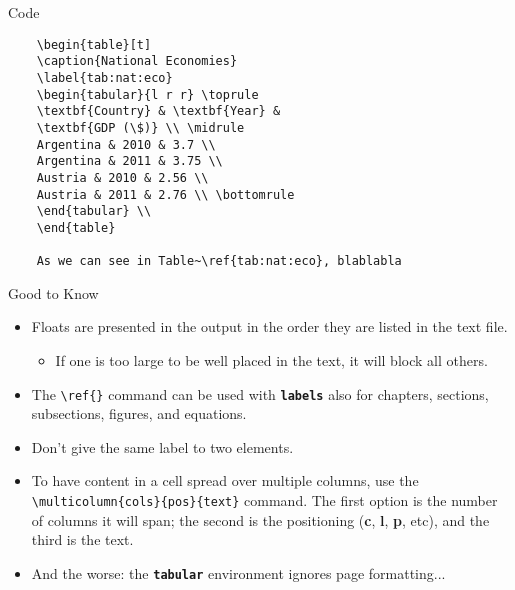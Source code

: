 \documentclass{beamer}
\newcommand{\bftt}[1]{\textbf{\texttt{#1}}}
\newcommand{\cmd}[1]{{\color[HTML]{008000}\bftt{#1}}}
\begin{document}
\begin{frame}[fragile]{Code}
	\begin{verbatim}
	\begin{table}[t]
	\caption{National Economies}
	\label{tab:nat:eco}
	\begin{tabular}{l r r} \toprule
	\textbf{Country} & \textbf{Year} &
	\textbf{GDP (\$)} \\ \midrule
	Argentina & 2010 & 3.7 \\
	Argentina & 2011 & 3.75 \\
	Austria & 2010 & 2.56 \\
	Austria & 2011 & 2.76 \\ \bottomrule
	\end{tabular} \\
	\end{table}
	
	As we can see in Table~\ref{tab:nat:eco}, blablabla
	\end{verbatim}
\end{frame}

\begin{frame}[fragile]{Good to Know}
	\begin{itemize}
		\item Floats are presented in the output in the order they are listed in the text file.
		\begin{itemize}
			\item If one is too large to be well placed in the text, it will block all others.
		\end{itemize}
		\item The \verb|\ref{}| command can be used with \cmd{labels} also for chapters, sections, subsections, figures, and equations.
		\item Don't give the same label to two elements.
		\item To have content in a cell spread over multiple columns, use the \verb|\multicolumn{cols}{pos}{text}| command. The first option is the number of columns it will span; the second is the positioning (\textbf{c}, \textbf{l}, \textbf{p{}}, etc), and the third is the text.
		\item And the worse: the \cmd{tabular} environment ignores page formatting...
	\end{itemize}
\end{frame}
\end{document}
